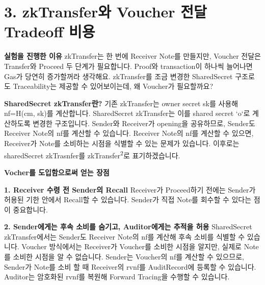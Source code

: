 \documentclass[11pt,a4paper]{article}
\begin{document}


\clearpage
{}\section*{3. zkTransfer와 Voucher 전달 Tradeoff 비용}
\textbf{실험을 진행한 이유}\newline
zkTransfer는 한 번에 Receiver Note를 만들지만, Voucher 전달은 Transfer와 Proceed 두 단계가 필요합니다.\newline
Proof와 transaction이 하나씩 늘어나면 Gas가 당연히 증가할꺼라 생각해요.\newline
zkTransfer를 조금 변경한 SharedSecret 구조로도 Traceability는 제공할 수 있어보이는데, 왜 Voucher가 필요할까요?

\textbf{SharedSecret zkTransfer란?}\newline
기존 zkTransfer는 owner secret sk를 사용해 nf=H(cm, sk)를 계산합니다.\newline
SharedSecret zkTransfer는 이를 shared secret `o`로 계산하도록 변경한 구조입니다.\newline
Sender와 Receiver가 opening을 공유하므로, Sender도 Receiver Note의 nf를 계산할 수 있습니다.\newline
Receiver Note의 nf를 계산할 수 있으면, Receiver가 Note를 소비하는 시점을 식별할 수 있는 문제가 있습니다.\newline
이후로는 sharedSecret zkTrasnfer를 zkTransfer\textsuperscript{2}로 표기하겠습니다.

\textbf{Vocher를 도입함으로써 얻는 장점}

\textbf{1. Receiver 수령 전 Sender의 Recall}\newline
Receiver가 Proceed하기 전에는 Sender가 허용된 기한 안에서 Recall할 수 있습니다.\newline
Sender가 직접 Note를 회수할 수 있다는 점이 중요합니다.\newline

\textbf{2. Sender에게는 후속 소비를 숨기고, Auditor에게는 추적을 허용}\newline
SharedSecret zkTransfer에서는 Sender도 Receiver Note의 nf를 계산해 후속 소비를 식별할 수 있습니다.\newline
Voucher 방식에서는 Receiver가 Voucher를 소비한 시점을 알지만, 실제로 Note를 소비한 시점을 알 수 없습니다.\newline
Sender는 Voucher의 nf를 계산할 수 있으므로, Sender가 Note를 소비 할 때 Receiver의 rvnf를 AuditRecord에 등록할 수 있습니다.\newline
Auditor는 암호화된 rvnf를 복원해 Forward Tracing을 수행할 수 있습니다.\newline
\end{document}
